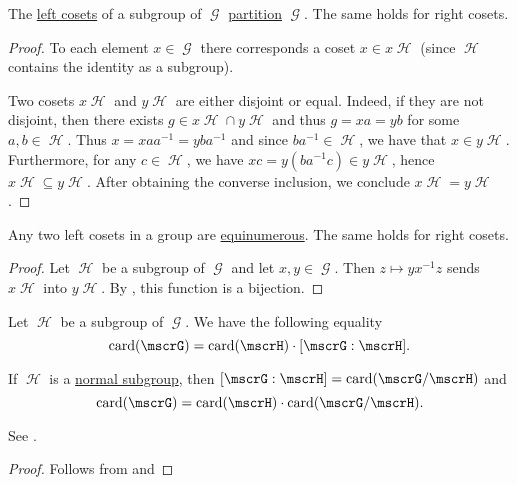 \begin{lemma}\label{thm:group_coset_partition}
  The \hyperref[def:group_cosets]{left cosets} of a subgroup of \( \mscrG \) \hyperref[def:set_partition]{partition} \( \mscrG \). The same holds for right cosets.
\end{lemma}
\begin{proof}
  To each element \( x \in \mscrG \) there corresponds a coset \( x \in x\mscrH \) (since \( \mscrH \) contains the identity as a subgroup).

  Two cosets \( x\mscrH \) and \( y\mscrH \) are either disjoint or equal. Indeed, if they are not disjoint, then there exists \( g \in x\mscrH \cap y\mscrH \) and thus \( g = xa = yb \) for some \( a, b \in \mscrH \). Thus \( x = x a a^{-1} = y b a^{-1} \) and since \( b a^{-1} \in \mscrH \), we have that \( x \in y\mscrH \). Furthermore, for any \( c \in \mscrH \), we have \( xc = y(b a^{-1} c) \in y\mscrH \), hence \( x\mscrH \subseteq y\mscrH \). After obtaining the converse inclusion, we conclude \( x\mscrH = y\mscrH \).
\end{proof}

\begin{lemma}\label{thm:group_coset_bijection}
  Any two left cosets in a group are \hyperref[def:equinumerous_sets]{equinumerous}. The same holds for right cosets.
\end{lemma}
\begin{proof}
  Let \( \mscrH \) be a subgroup of \( \mscrG \) and let \( x, y \in \mscrG \). Then \( z \mapsto y x^{-1} z \) sends \( x\mscrH \) into \( y\mscrH \). By , this function is a bijection.
\end{proof}

\begin{theorem}\label{thm:lagranges_theorem_for_groups}
  Let \( \mscrH \) be a subgroup of \( \mscrG \). We have the following equality
  \begin{equation}\label{eq:thm:lagranges_theorem_for_groups/index}
    \card(\mscrG) = \card(\mscrH) \cdot [\mscrG : \mscrH].
  \end{equation}

  If \( \mscrH \) is a \hyperref[def:normal_subgroup]{normal subgroup}, then \( [\mscrG : \mscrH] = \card(\mscrG / \mscrH) \) and
  \begin{equation}\label{eq:thm:lagranges_theorem_for_groups/card}
    \card(\mscrG) = \card(\mscrH) \cdot \card(\mscrG / \mscrH).
  \end{equation}

  See .
\end{theorem}
\begin{proof}
  Follows from  and 
\end{proof}

